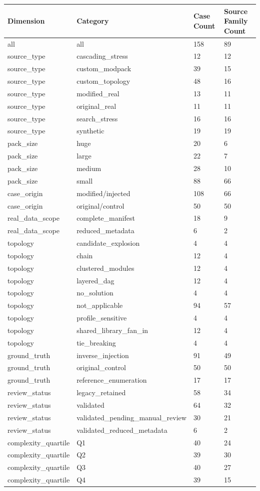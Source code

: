 \begin{tabular}{llll}
\hline
Dimension & Category & Case Count & Source Family Count \\
\hline
all & all & 158 & 89 \\
source\_type & cascading\_stress & 12 & 12 \\
source\_type & custom\_modpack & 39 & 15 \\
source\_type & custom\_topology & 48 & 16 \\
source\_type & modified\_real & 13 & 11 \\
source\_type & original\_real & 11 & 11 \\
source\_type & search\_stress & 16 & 16 \\
source\_type & synthetic & 19 & 19 \\
pack\_size & huge & 20 & 6 \\
pack\_size & large & 22 & 7 \\
pack\_size & medium & 28 & 10 \\
pack\_size & small & 88 & 66 \\
case\_origin & modified/injected & 108 & 66 \\
case\_origin & original/control & 50 & 50 \\
real\_data\_scope & complete\_manifest & 18 & 9 \\
real\_data\_scope & reduced\_metadata & 6 & 2 \\
topology & candidate\_explosion & 4 & 4 \\
topology & chain & 12 & 4 \\
topology & clustered\_modules & 12 & 4 \\
topology & layered\_dag & 12 & 4 \\
topology & no\_solution & 4 & 4 \\
topology & not\_applicable & 94 & 57 \\
topology & profile\_sensitive & 4 & 4 \\
topology & shared\_library\_fan\_in & 12 & 4 \\
topology & tie\_breaking & 4 & 4 \\
ground\_truth & inverse\_injection & 91 & 49 \\
ground\_truth & original\_control & 50 & 50 \\
ground\_truth & reference\_enumeration & 17 & 17 \\
review\_status & legacy\_retained & 58 & 34 \\
review\_status & validated & 64 & 32 \\
review\_status & validated\_pending\_manual\_review & 30 & 21 \\
review\_status & validated\_reduced\_metadata & 6 & 2 \\
complexity\_quartile & Q1 & 40 & 24 \\
complexity\_quartile & Q2 & 39 & 30 \\
complexity\_quartile & Q3 & 40 & 27 \\
complexity\_quartile & Q4 & 39 & 15 \\
\hline
\end{tabular}
